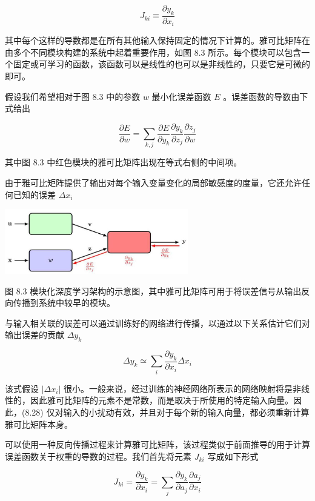 \documentclass[10pt]{report}
\begin{document}
\[
{J}_{ki} \equiv  \frac{\partial {y}_{k}}{\partial {x}_{i}} \tag{8.26}
\]

其中每个这样的导数都是在所有其他输入保持固定的情况下计算的。雅可比矩阵在由多个不同模块构建的系统中起着重要作用，如图 8.3 所示。每个模块可以包含一个固定或可学习的函数，该函数可以是线性的也可以是非线性的，只要它是可微的即可。

假设我们希望相对于图 8.3 中的参数 \(w\) 最小化误差函数 \(E\) 。误差函数的导数由下式给出

\[
\frac{\partial E}{\partial w} = \mathop{\sum }\limits_{{k,j}}\frac{\partial E}{\partial {y}_{k}}\frac{\partial {y}_{k}}{\partial {z}_{j}}\frac{\partial {z}_{j}}{\partial w} \tag{8.27}
\]

其中图 8.3 中红色模块的雅可比矩阵出现在等式右侧的中间项。

由于雅可比矩阵提供了输出对每个输入变量变化的局部敏感度的度量，它还允许任何已知的误差 \(\Delta {x}_{i}\)

\begin{center}
\includegraphics[max width=0.6\textwidth]{images/0194e279-9b28-703a-88f4-c3ac21e2010d_260_730_340_812_287_0.jpg}
\end{center}
\hspace*{3em} 

图 8.3 模块化深度学习架构的示意图，其中雅可比矩阵可用于将误差信号从输出反向传播到系统中较早的模块。

与输入相关联的误差可以通过训练好的网络进行传播，以通过以下关系估计它们对输出误差的贡献 \(\Delta {y}_{k}\)

\[
\Delta {y}_{k} \simeq  \mathop{\sum }\limits_{i}\frac{\partial {y}_{k}}{\partial {x}_{i}}\Delta {x}_{i} \tag{8.28}
\]

该式假设 \(\left| {\Delta {x}_{i}}\right|\) 很小。一般来说，经过训练的神经网络所表示的网络映射将是非线性的，因此雅可比矩阵的元素不是常数，而是取决于所使用的特定输入向量。因此，(8.28) 仅对输入的小扰动有效，并且对于每个新的输入向量，都必须重新计算雅可比矩阵本身。

可以使用一种反向传播过程来计算雅可比矩阵，该过程类似于前面推导的用于计算误差函数关于权重的导数的过程。我们首先将元素 \({J}_{ki}\) 写成如下形式

\[
{J}_{ki} = \frac{\partial {y}_{k}}{\partial {x}_{i}} = \mathop{\sum }\limits_{j}\frac{\partial {y}_{k}}{\partial {a}_{j}}\frac{\partial {a}_{j}}{\partial {x}_{i}}
\]
\end{document}
